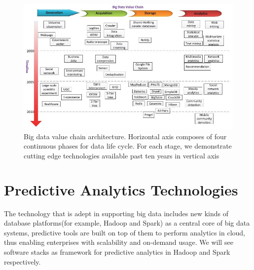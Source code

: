 \documentclass[runningheads]{llncs}
\begin{document}
\begin{figure}[htbp]
	\centering
	\vspace{-0.85cm}
	\hspace*{-0.45cm}
	\includegraphics[scale=0.6]{Figure4.jpg}
	\caption{Big data value chain architecture. Horizontal axis composes of four continuous phases for data life cycle. For each stage, we demonstrate cutting edge technologies available past ten years in vertical axis}
	\label{fig:Figure4}
	\vspace{-0.5em}
\end{figure}
\section{Predictive Analytics Technologies}
The technology that is adept in supporting big data includes  new kinds of database platforms(for example, Hadoop and Spark) as a central core of big data systems, predictive tools are built on top of them to perform analytics in cloud, thus enabling enterprises with scalability and on-demand usage. We will see software stacks as framework for predictive analytics in Hadoop and Spark respectively.
\end{document}
